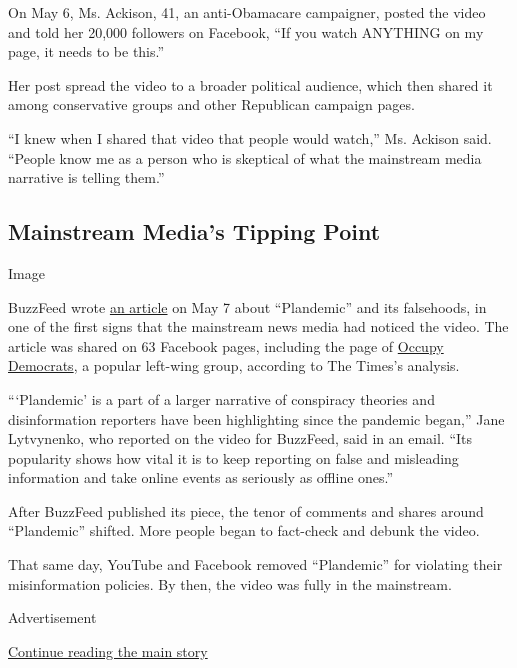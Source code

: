 On May 6, Ms. Ackison, 41, an anti-Obamacare campaigner, posted the
video and told her 20,000 followers on Facebook, ``If you watch ANYTHING
on my page, it needs to be this.''

Her post spread the video to a broader political audience, which then
shared it among conservative groups and other Republican campaign pages.

``I knew when I shared that video that people would watch,'' Ms. Ackison
said. ``People know me as a person who is skeptical of what the
mainstream media narrative is telling them.''

\hypertarget{mainstream-medias-tipping-point}{%
\subsection{Mainstream Media's Tipping
Point}\label{mainstream-medias-tipping-point}}

Image

BuzzFeed wrote
\href{https://www.buzzfeednews.com/article/janelytvynenko/coronavirus-plandemic-viral-harmful-fauci-mikovits?utm_source=dynamic\&utm_campaign=bffbbuzzfeedscience\&ref=bffbbuzzfeedscience\&fbclid=IwAR1n7O_S9Y3xabxOgcn2-KRQPWBWUsO5GgR3WmZp-JQhRIFBRtXCg-fn1uY}{an
article} on May 7 about ``Plandemic'' and its falsehoods, in one of the
first signs that the mainstream news media had noticed the video. The
article was shared on 63 Facebook pages, including the page of
\href{https://www.nytimes.com/2020/05/18/us/politics/occupy-democrats-facebook.html}{Occupy
Democrats}, a popular left-wing group, according to The Times's
analysis.

```Plandemic' is a part of a larger narrative of conspiracy theories and
disinformation reporters have been highlighting since the pandemic
began,'' Jane Lytvynenko, who reported on the video for BuzzFeed, said
in an email. ``Its popularity shows how vital it is to keep reporting on
false and misleading information and take online events as seriously as
offline ones.''

After BuzzFeed published its piece, the tenor of comments and shares
around ``Plandemic'' shifted. More people began to fact-check and debunk
the video.

That same day, YouTube and Facebook removed ``Plandemic'' for violating
their misinformation policies. By then, the video was fully in the
mainstream.

Advertisement

\protect\hyperlink{after-bottom}{Continue reading the main story}

